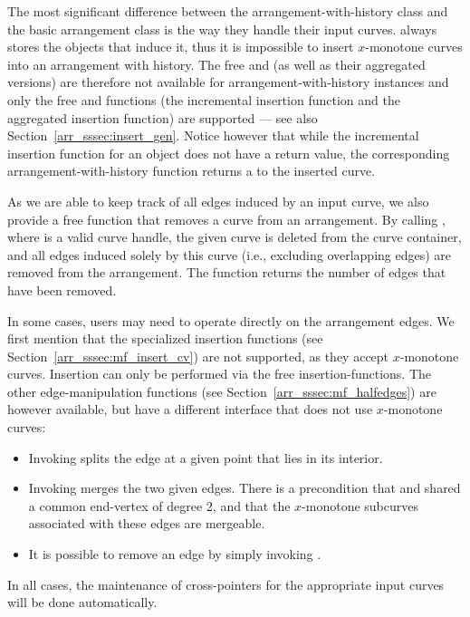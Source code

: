 The most significant difference between the arrangement-with-history class
and the basic arrangement class is the way they handle their input curves.
 always stores the  objects
that induce it, thus it is impossible to insert $x$-monotone curves into
an arrangement with history. The free 
and  (as well as their aggregated versions)
are therefore not available for arrangement-with-history instances
and only the free  and  functions
(the incremental insertion function and the aggregated insertion function)
are supported --- see also Section~\ref{arr_sssec:insert_gen}. Notice however
that while the incremental insertion function  for
an  object  does not have a return value,
the corresponding arrangement-with-history function returns a
 to the inserted curve.

As we are able to keep track of all edges induced by an input curve, we also
provide a free function that removes a curve from an arrangement. By calling
, where  is a valid curve handle, the given curve
is deleted from the curve container, and all edges induced solely by
this curve (i.e., excluding overlapping edges) are removed from the 
arrangement. The function returns the number of edges that have been removed.

In some cases, users may need to operate directly on the arrangement edges.
We first mention that the specialized insertion functions (see 
Section~\ref{arr_sssec:mf_insert_cv}) are not supported, as they accept
$x$-monotone curves. Insertion can only be performed via the free 
insertion-functions. The other edge-manipulation functions 
(see Section~\ref{arr_sssec:mf_halfedges}) are however available, but have 
a different interface that does not use $x$-monotone curves:
\begin{itemize}
\item Invoking  splits the edge  at a given point
 that lies in its interior.
\item Invoking  merges the two given edges. There is
a precondition that  and  shared a common end-vertex of degree
2, and that the $x$-monotone subcurves associated with these edges are
mergeable.
\item It is possible to remove an edge by simply invoking
.
\end{itemize}
In all cases, the maintenance of cross-pointers for the appropriate input
curves will be done automatically.

